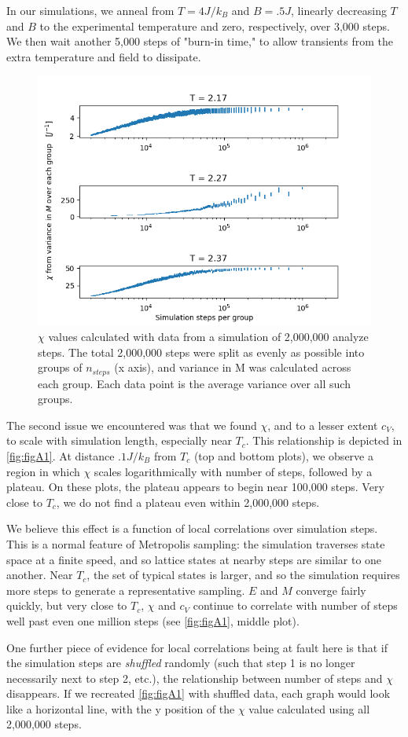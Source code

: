 \documentclass[letter,scriptaddress,twocolumn, prl,nofootinbib]{revtex4}
\begin{document}
In our simulations, we anneal from $T = 4 J/k_B$ and $B = .5 J$, linearly decreasing $T$ and $B$ to the experimental temperature and zero, respectively, over 3,000 steps. We then wait another 5,000 steps of "burn-in time," to allow transients from the extra temperature and field to dissipate.

\begin{figure}[h]
	\begin{center}
		\includegraphics[width=.4\textwidth]{figs/figA1.png}
		\caption{$\chi$ values calculated with data from a simulation of 2,000,000 analyze steps. The total 2,000,000 steps were split as evenly as possible into groups of $n_{steps}$ (x axis), and variance in M was calculated across each group. Each data point is the average variance over all such groups.}
		\label{fig:figA1}
	\end{center}
\end{figure}

The second issue we encountered was that we found $\chi$, and to a lesser extent $c_V$, to scale with simulation length, especially near $T_c$. This relationship is depicted in \autoref{fig:figA1}. At distance $.1 J/k_B$ from $T_c$ (top and bottom plots), we observe a region in which $\chi$ scales logarithmically with number of steps, followed by a plateau. On these plots, the plateau appears to begin near 100,000 steps. Very close to $T_c$, we do not find a plateau even within 2,000,000 steps.

We believe this effect is a function of local correlations over simulation steps. This is a normal feature of Metropolis sampling: the simulation traverses state space at a finite speed, and so lattice states at nearby steps are similar to one another. Near $T_c$, the set of typical states is larger, and so the simulation requires more steps to generate a representative sampling. $E$ and $M$ converge fairly quickly, but very close to $T_c$, $\chi$ and $c_V$ continue to correlate with number of steps well past even one million steps (see \autoref{fig:figA1}, middle plot).

One further piece of evidence for local correlations being at fault here is that if the simulation steps are \textit{shuffled} randomly (such that step 1 is no longer necessarily next to step 2, etc.), the relationship between number of steps and $\chi$ disappears. If we recreated \autoref{fig:figA1} with shuffled data, each graph would look like a horizontal line, with the y position of the $\chi$ value calculated using all 2,000,000 steps.
\end{document}
